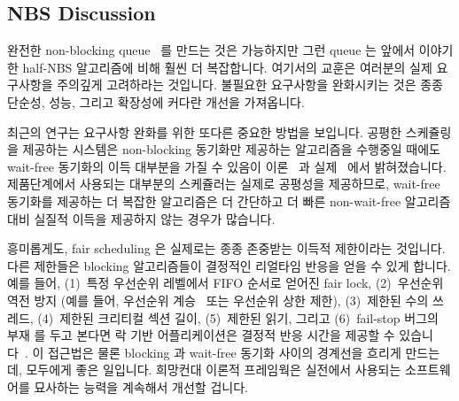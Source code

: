 \fi

\subsection{NBS Discussion}
\label{sec:advsync:NBS Discussion}

완전한 non-blocking queue~\cite{MichaelScott96} 를 만드는 것은 가능하지만 그런
queue 는 앞에서 이야기한 half-NBS 알고리즘에 비해 훨씬 더 복잡합니다.
여기서의 교훈은 여러분의 실제 요구사항을 주의깊게 고려하라는 것입니다.
불필요한 요구사항을 완화시키는 것은 종종 단순성, 성능, 그리고 확장성에 커다란
개선을 가져옵니다.

최근의 연구는 요구사항 완화를 위한 또다른 중요한 방법을 보입니다.
공평한 스케쥴링을 제공하는 시스템은 non-blocking 동기화만 제공하는 알고리즘을
수행중일 때에도 wait-free 동기화의 이득 대부분을 가질 수 있음이
이론~\cite{DanAlitarh2013PracticalProgress} 과 실제~\cite{SamyAlBahra2013NBS}
에서 밝혀졌습니다.
제품단계에서 사용되는 대부분의 스케쥴러는 실제로 공평성을 제공하므로, wait-free
동기화를 제공하는 더 복잡한 알고리즘은 더 간단하고 더 빠른 non-wait-free
알고리즘 대비 실질적 이득을 제공하지 않는 경우가 많습니다.

\iffalse

It is possible to create fully non-blocking queues~\cite{MichaelScott96},
however, such queues are much more complex than the half-NBS algorithm
outlined above.
The lesson here is to carefully consider your actual requirements.
Relaxing irrelevant requirements can often result in great
improvements in simplicity, performance, and scalability.

Recent research points to another important way to relax requirements.
It turns out that systems providing fair scheduling can enjoy most
of the benefits of wait-free synchronization even when running
algorithms that provide only non-blocking
synchronization, both in theory~\cite{DanAlitarh2013PracticalProgress}
and in practice~\cite{SamyAlBahra2013NBS}.
Because most schedulers used in production do in fact provide fairness,
the more-complex algorithms providing wait-free synchronization usually
provide no practical advantages over simpler and faster non-wait-free
algorithms.

\fi

흥미롭게도, fair scheduling 은 실제로는 종종 존중받는 이득적 제한이라는
것입니다.
다른 제한들은 blocking 알고리즘들이 결정적인 리얼타임 반응을 얻을 수 있게
합니다.
예를 들어,
(1)~특정 우선순위 레벨에서 FIFO 순서로 얻어진 fair lock,
(2)~우선순위 역전 방지 (예를 들어, 우선순위
계승~\cite{Takada:1995:RSN:527074.828566,Cai-DongWang1996PrioInherLock} 또는
우선순위 상한 제한),
(3)~제한된 수의 쓰레드,
(4)~제한된 크리티컬 섹션 길이,
(5)~제한된 읽기,
그리고
(6)~fail-stop 버그의 부재
를 두고 본다면 락 기반 어플리케이션은 결정적 반응 시간을 제공할 수
있습니다~\cite{BjoernBrandenburgPhD,DipankarSarma2004OLSscalability}.
이 접근법은 물론 blocking 과 wait-free 동기화 사이의 경계선을 흐리게 만드는데,
모두에게 좋은 일입니다.
희망컨대 이론적 프레임웍은 실전에서 사용되는 소프트웨어를 묘사하는 능력을
계속해서 개선할 겁니다.

